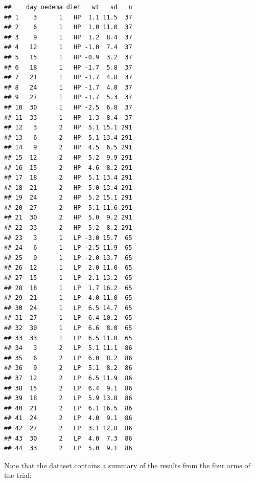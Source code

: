 \documentclass[12pt,]{book}
\theoremstyle{definition}
\theoremstyle{definition}
\theoremstyle{definition}
\theoremstyle{remark}
\begin{document}
\begin{verbatim}
##    day oedema diet   wt   sd   n
## 1    3      1   HP  1.1 11.5  37
## 2    6      1   HP  1.0 11.0  37
## 3    9      1   HP  1.2  8.4  37
## 4   12      1   HP -1.0  7.4  37
## 5   15      1   HP -0.9  3.2  37
## 6   18      1   HP -1.7  5.8  37
## 7   21      1   HP -1.7  4.8  37
## 8   24      1   HP -1.7  4.8  37
## 9   27      1   HP -1.7  5.3  37
## 10  30      1   HP -2.5  6.8  37
## 11  33      1   HP -1.3  8.4  37
## 12   3      2   HP  5.1 15.1 291
## 13   6      2   HP  5.1 13.4 291
## 14   9      2   HP  4.5  6.5 291
## 15  12      2   HP  5.2  9.9 291
## 16  15      2   HP  4.6  8.2 291
## 17  18      2   HP  5.1 13.4 291
## 18  21      2   HP  5.0 13.4 291
## 19  24      2   HP  5.2 15.1 291
## 20  27      2   HP  5.1 11.6 291
## 21  30      2   HP  5.0  9.2 291
## 22  33      2   HP  5.2  8.2 291
## 23   3      1   LP -3.0 15.7  65
## 24   6      1   LP -2.5 11.9  65
## 25   9      1   LP -2.0 13.7  65
## 26  12      1   LP  2.0 11.0  65
## 27  15      1   LP  2.1 13.2  65
## 28  18      1   LP  1.7 16.2  65
## 29  21      1   LP  4.0 11.0  65
## 30  24      1   LP  6.5 14.7  65
## 31  27      1   LP  6.4 10.2  65
## 32  30      1   LP  6.6  8.0  65
## 33  33      1   LP  6.5 11.0  65
## 34   3      2   LP  5.1 11.1  86
## 35   6      2   LP  6.0  8.2  86
## 36   9      2   LP  5.1  8.2  86
## 37  12      2   LP  6.5 11.9  86
## 38  15      2   LP  6.4  9.1  86
## 39  18      2   LP  5.9 13.8  86
## 40  21      2   LP  6.1 16.5  86
## 41  24      2   LP  4.0  9.1  86
## 42  27      2   LP  3.1 12.8  86
## 43  30      2   LP  4.0  7.3  86
## 44  33      2   LP  5.0  9.1  86
\end{verbatim}

Note that the dataset contains a summary of the results from the four
arms of the trial:
\end{document}
